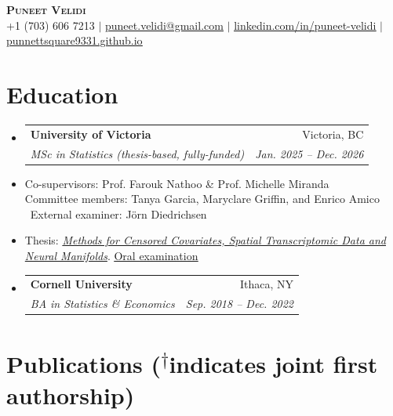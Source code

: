 \documentclass[letterpaper,11pt]{article}
\makeatletter
\newcommand{\resumeSubheading}[4]{
  \vspace{-2pt}\item
    \begin{tabular*}{0.97\textwidth}[t]{l@{\extracolsep{\fill}}r}
      \textbf{#1} & #2 \\
      \textit{\small#3} & \textit{\small #4} \\
    \end{tabular*}\vspace{-7pt}
}
\newcommand{\resumeSubHeadingListStart}{\begin{itemize}[leftmargin=0.15in, label={}]}
\newcommand{\resumeSubHeadingListEnd}{\end{itemize}}
\newcommand{\jfa}{\textsuperscript{$\dagger$}}
\makeatother
\begin{document}
\begin{center}
    \textbf{\Huge \scshape Puneet Velidi} \\ \vspace{1pt}
    \small +1 (703) 606 7213 $|$ \href{mailto:puneet.velidi@gmail.com}{\underline{puneet.velidi@gmail.com}} $|$
    \href{https://linkedin.com/in/puneet-velidi}{\underline{linkedin.com/in/puneet-velidi}}
      $|$   \href{https://punnettsquare9331.github.io/}{\underline{punnettsquare9331.github.io}}
\end{center}

\vspace{-10pt}
\section{Education}
  \resumeSubHeadingListStart
    \resumeSubheading
      {University of Victoria}{Victoria, BC}
      {MSc in Statistics (thesis-based, fully-funded)}
      {Jan. 2025 -- Dec. 2026}
        \footnotesize \item Co-supervisors: Prof. Farouk Nathoo \& Prof. Michelle Miranda\\[-1pt]
        {\scriptsize Committee members: Tanya Garcia, Maryclare Griffin, and Enrico Amico \textbar\ External examiner: J\"orn Diedrichsen}
        \vspace{-5pt}
       \item Thesis: \href{https://dspace.library.uvic.ca/items/512a9f35-5f31-42f1-9f30-50feaaaf1158}{\textit{Methods for Censored Covariates, Spatial Transcriptomic Data and Neural Manifolds}}. \href{https://www.uvic.ca/graduatestudies/oral-exams/exam-candidates/data/puneet-velidi.php}{\underline{Oral examination}}
       \normalsize

    \resumeSubheading
      {Cornell University}{Ithaca, NY}
      {BA in Statistics \& Economics}
      {Sep. 2018 -- Dec. 2022}
  \resumeSubHeadingListEnd

\section{Publications \normalfont\footnotesize (\jfa indicates joint first authorship)}
\end{document}
